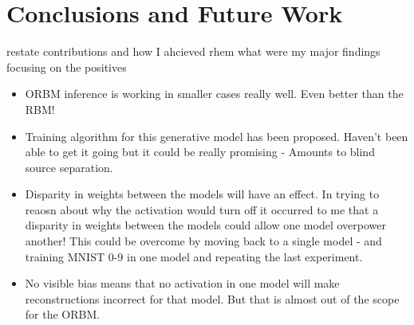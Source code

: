 \chapter{Conclusions and Future Work}
restate contributions and how I ahcieved rhem
what were my major findings focusing on the positives
\begin{itemize}
  \item ORBM inference is working in smaller cases really well. Even better than the RBM!
  \item Training algorithm for this generative model has been proposed. Haven't been able to get it going but it could be really promising - Amounts to blind source separation.
  \item Disparity in weights between the models will have an effect. In trying to reaosn about why the activation would turn off it occurred to me that a disparity in weights between the models could allow one model overpower another! This could be overcome by moving back to a single model - and training MNIST 0-9 in one model and repeating the last experiment.
  \item No visible bias means that no activation in one model will make reconstructions incorrect for that model. But that is almost out of the scope for the ORBM.
\end{itemize}
